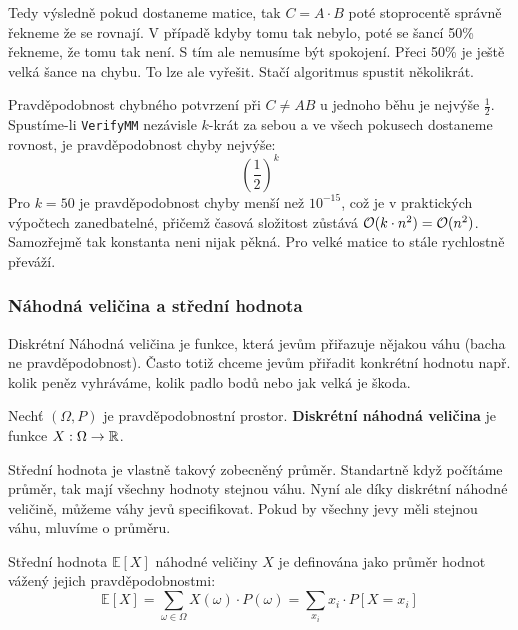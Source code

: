 \bigskip

\noindent Tedy výsledně pokud dostaneme matice, tak $C = A \cdot B$ poté stoprocentě správně řekneme že se rovnají. V případě kdyby tomu tak nebylo, poté se šancí 50\% řekneme, že tomu tak není. S tím ale nemusíme být spokojení. Přeci 50\% je ještě velká šance na chybu. To lze ale vyřešit. Stačí algoritmus spustit několikrát.

\medskip

\begin{remark}
Pravděpodobnost chybného potvrzení při $C \neq AB$ u jednoho běhu je nejvýše $\frac{1}{2}$.
Spustíme-li \texttt{VerifyMM} nezávisle $k$-krát za sebou a ve všech pokusech dostaneme rovnost, je pravděpodobnost chyby nejvýše:
$$\left( \frac{1}{2} \right)^k$$
Pro $k = 50$ je pravděpodobnost chyby menší než $10^{-15}$, což je v praktických výpočtech zanedbatelné, přičemž časová složitost zůstává $\mathcal{O}(k \cdot n^2) = \mathcal{O}(n^2)$. Samozřejmě tak konstanta neni nijak pěkná. Pro velké matice to stále rychlostně převáží.
\end{remark}

\bigskip

\subsubsection{Náhodná veličina a střední hodnota}

\noindent Diskrétní Náhodná veličina je funkce, která jevům přiřazuje nějakou váhu (bacha ne pravděpodobnost). Často totiž chceme jevům přiřadit konkrétní hodnotu např. kolik peněz vyhráváme, kolik padlo bodů nebo jak velká je škoda.

\medskip

\begin{definition}
Nechť $(\Omega, P)$ je pravděpodobnostní prostor. \textbf{Diskrétní náhodná veličina} je funkce $X: \Omega \to \mathbb{R}$.
\end{definition}

\bigskip

\noindent Střední hodnota je vlastně takový zobecněný průměr. Standartně když počítáme průměr, tak mají všechny hodnoty stejnou váhu. Nyní ale díky diskrétní náhodné veličině, můžeme váhy jevů specifikovat. Pokud by všechny jevy měli stejnou váhu, mluvíme o průměru.

\medskip

\begin{definition}
Střední hodnota $\mathbb{E}[X]$ náhodné veličiny $X$ je definována jako průměr hodnot vážený jejich pravděpodobnostmi:
$$\mathbb{E}[X] = \sum_{\omega \in \Omega} X(\omega) \cdot P(\omega) = \sum_{x_i} x_i \cdot P[X = x_i]$$
\end{definition}

